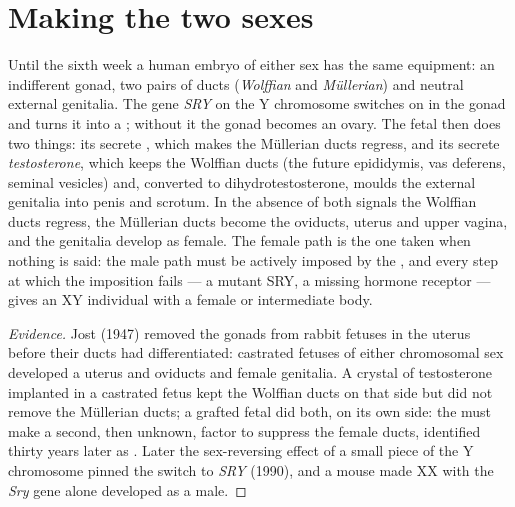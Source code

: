 \section{Making the two sexes}

\begin{proposition}\label{prop:b2:mammal-reproduction:sex}
Until the sixth week a human embryo of either sex has the same
equipment: an indifferent gonad, two pairs of ducts (\emph{Wolffian}
and \emph{Müllerian}) and neutral external genitalia. The gene
\emph{SRY} on the Y chromosome switches on in the gonad and turns it
into a ; without it the gonad becomes an ovary. The fetal
 then does two things: its  secrete
\emph{}, which makes the Müllerian ducts
regress, and its  secrete \emph{testosterone}, which
keeps the Wolffian ducts (the future epididymis, vas deferens,
seminal vesicles) and, converted to dihydrotestosterone, moulds the
external genitalia into penis and scrotum. In the absence of both
signals the Wolffian ducts regress, the Müllerian ducts become the
oviducts, uterus and upper vagina, and the genitalia develop as
female. The female path is the one taken when nothing is said: the
male path must be actively imposed by the , and every step at
which the imposition fails --- a mutant SRY, a missing hormone
receptor --- gives an XY individual with a female or intermediate
body.
\end{proposition}
\begin{proof}[Evidence]
Jost (1947) removed the gonads from rabbit fetuses in the uterus
before their ducts had differentiated: castrated fetuses of either
chromosomal sex developed a uterus and oviducts and female
genitalia. A crystal of testosterone implanted in a castrated fetus
kept the Wolffian ducts on that side but did not remove the
Müllerian ducts; a grafted fetal  did both, on its own side:
the  must make a second, then unknown, factor to suppress the
female ducts, identified thirty years later as . Later the sex-reversing effect of a small piece of the Y
chromosome pinned the switch to \emph{SRY} (1990), and a mouse made
XX with the \emph{Sry} gene alone developed as a male.
\end{proof}

